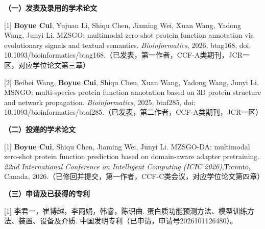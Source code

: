 
\begin{publication}
  \noindent\songti\textbf{（一）发表及录用的学术论文}

  [1] \textbf{Boyue Cui}, Yujuan Li, Shiqu Chen, Jiaming Wei, Xuan Wang, Yadong Wang, Junyi Li. MZSGO: multimodal zero-shot protein function annotation via evolutionary signals and textual semantics. \textit{Bioinformatics}, 2026, btag168, doi: 10.1093/bioinformatics/btag168.（已发表，第一作者，CCF-A类期刊，JCR一区，对应学位论文第三章）

  [2] Beibei Wang, \textbf{Boyue Cui}, Shiqu Chen, Xuan Wang, Yadong Wang, Junyi Li. MSNGO: multi-species protein function annotation based on 3D protein structure and network propagation. \textit{Bioinformatics}, 2025, btaf285, doi: 10.1093/bioinformatics/btaf285.（已发表，第二作者，CCF-A类期刊，JCR一区）

  \noindent\songti\textbf{（二）投递的学术论文}

  [1] \textbf{Boyue Cui}, Shiqu Chen, Jiaming Wei, Junyi Li. MZSGO-DA: multimodal zero-shot protein function prediction based on domain-aware adapter pretraining. \textit{22nd International Conference on Intelligent Computing (ICIC 2026)},Toronto, Canada, 2026.（已修回并提交，第一作者，CCF-C类会议，对应学位论文第四章）

  \noindent\songti\textbf{（三）申请及已获得的专利}

  [1] 李君一，{\heiti 崔博越}，李雨娟，韩睿，陈识曲. 蛋白质功能预测方法、模型训练方法、装置、设备及介质. 中国发明专利（已申请，申请号2026101126480）。

\end{publication}
